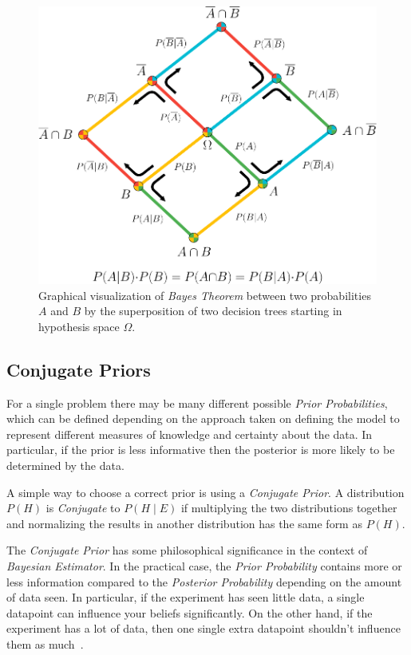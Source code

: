 \begin{figure}
\centering
\includegraphics[width=.7\textwidth]{figures/Bayes_Theorem.png}
\caption{Graphical visualization of \emph{Bayes Theorem} between two probabilities $A$ and $B$ by the superposition of two decision trees starting in hypothesis space $\Omega$.}
\label{fig:Bayes_Theorem}
\end{figure}

\subsection{Conjugate Priors}
\label{subsec:conjugate}

For a single problem there may be many different possible \emph{Prior Probabilities}, which can be defined depending on the approach taken on defining the model to represent different measures of knowledge and certainty about the data\footnotemark{}. In particular, if the prior is less informative then the posterior is more likely to be determined by the data.


A simple way to choose a correct prior is using a \emph{Conjugate Prior}. A distribution $P \left( H \right)$ is \emph{Conjugate} to $P \left( H \mid E \right)$ if multiplying the two distributions together and normalizing the results in another distribution has the same form as $P \left( H \right)$.

The \emph{Conjugate Prior} has some philosophical significance in the context of \emph{Bayesian Estimator}. In the practical case, the \emph{Prior Probability} contains more or less information compared to the \emph{Posterior Probability} depending on the amount of data seen. In particular, if the experiment has seen little data, a single datapoint can influence your beliefs significantly. On the other hand, if the experiment has a lot of data, then one single extra datapoint shouldn't influence them as much~\cite{gelman2003}.

